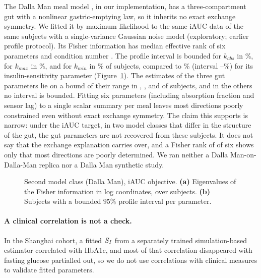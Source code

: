 The Dalla Man meal model \citep{dallaman2007}, in our implementation, has a three-compartment gut with a nonlinear
gastric-emptying law, so it inherits no exact exchange symmetry. We fitted it by maximum likelihood to the same iAUC data
of the same \resDmN{} subjects with a single-variance Gaussian noise model (exploratory; earlier profile protocol). Its
Fisher information has median effective rank \resDmRankMedian{} of six parameters and condition number
\resDmCondMedian. The profile interval is bounded for $k_{abs}$ in \resDmBoundedKabs\%, for $k_{max}$ in \resDmBoundedKmax\%, and for $k_{min}$ in \resDmBoundedKmin\% of subjects, compared to \resDmBoundedVmx\% (interval
\resDmBoundedVmxLow--\resDmBoundedVmxHigh\%) for its insulin-sensitivity parameter (Figure~\ref{fig:dm}). The estimates
of the three gut parameters lie on a bound of their range in \resDmPinnedKabs, \resDmPinnedKmax, and \resDmPinnedKmin{}
of \resDmN{} subjects, and in the others no interval is bounded. Fitting six parameters (including absorption fraction and sensor lag) to a single scalar summary per meal leaves most directions poorly constrained even without exact exchange symmetry. The claim this
supports is narrow: under the iAUC target, in two model classes that differ in the structure of the gut, the gut
parameters are not recovered from these subjects. It does not say that the exchange explanation carries over, and a
Fisher rank of \resDmRankMedian{} of six shows only that most directions are poorly determined. We ran neither a Dalla Man-on-Dalla-Man replica nor a Dalla Man synthetic study.

\begin{figure}[tbp]
\centering
{}
\caption{Second model class (Dalla Man), iAUC objective. \textbf{(a)} Eigenvalues of the Fisher information in
log coordinates, over subjects. \textbf{(b)} Subjects with a bounded $95\%$ profile interval per parameter.}
\label{fig:dm}
\end{figure}

\paragraph{A clinical correlation is not a check.}\label{apx:leakage}
In the Shanghai cohort, a fitted $S_I$ from a separately trained simulation-based estimator correlated with HbA1c, and most of that correlation
disappeared with fasting glucose partialled out, so we do not use correlations with clinical measures to validate
fitted parameters.
\FloatBarrier
